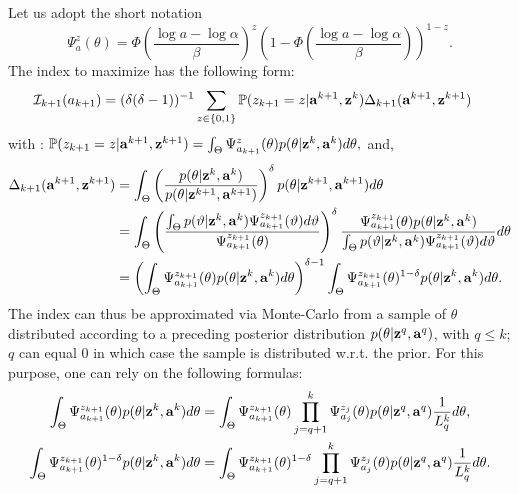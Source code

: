Let us adopt the short notation
    \begin{equation}
        \Psi^z_a(\theta)=\Phi\left(\frac{\log a-\log\alpha}{\beta}\right)^z\left(1-\Phi\left(\frac{\log a-\log\alpha}{\beta}\right)\right)^{1-z}.
    \end{equation}
The index to maximize has the following form:
    \begin{align}
        \mathcal{I}_{k+1}(a_{k+1})&= (\delta(\delta-1))^{-1}
            \sum_{z\in\{0,1\}}
                \mathbb{P}({z_{k+1}}=z|\mathbf{a}^{k+1},\mathbf{z}^{k})
                \Delta_{k+1}(\mathbf{a}^{k+1},\mathbf{z}^{k+1})
    \end{align}
with :
        $\mathbb{P}({z_{k+1}}=z|\mathbf{a}^{k+1},\mathbf{z}^{k+1}) = \int_{\Theta}\Psi^{z}_{a_{k+1}}(\theta)p(\theta|\mathbf{z}^{k},\mathbf{a}^{k})d\theta,$
and,
    \begin{align}
        \Delta_{k+1}(\mathbf{a}^{k+1},\mathbf{z}^{k+1}) &=
            \int_{\Theta}\left(\frac{p(\theta|\mathbf{z}^{k},\mathbf{a}^{k})}{p(\theta|\mathbf{z}^{k+1},\mathbf{a}^{k+1})}\right)^{\delta}p(\theta|\mathbf{z}^{k+1},\mathbf{a}^{k+1})d\theta \nonumber\\
        &=\int_\Theta \left(\frac{\int_\Theta p(\vartheta|\mathbf{z}^k,\mathbf{a}^k)\Psi^{z_{k+1}}_{a_{k+1}}(\vartheta)d\vartheta}{\Psi^{z_{k+1}}_{a_{k+1}}(\theta) } \right)^\delta \frac{\Psi^{z_{k+1}}_{a_{k+1}}(\theta)p(\theta|\mathbf{z}^k,\mathbf{a}^k) }{\int_\Theta p(\vartheta|\mathbf{z}^k,\mathbf{a}^k)\Psi^{z_{k+1}}_{a_{k+1}}(\vartheta)d\vartheta} d\theta\\
        &= \left(\int_\Theta \Psi^{z_{k+1}}_{a_{k+1}}(\theta) p(\theta| \mathbf{z}^k, \mathbf{a}^k) d\theta\right)^{\delta-1}  \int_\Theta \Psi^{z_{k+1}}_{a_{k+1}}(\theta)^{1-\delta} p(\theta|\mathbf{z}^k,\mathbf{a}^k)  d\theta.\nonumber
    \end{align}
The index can thus be approximated via Monte-Carlo from a sample of $\theta$ distributed according to a preceding posterior distribution $p(\theta|\mathbf{z}^q,\mathbf{a}^q)$, with $q\leq k$; $q$ can equal $0$ in which case the sample is distributed w.r.t. the prior. For this purpose, one can rely on the following formulas:
    \begin{align}
        \int_\Theta\Psi^{z_{k+1}}_{a_{k+1}}(\theta)p(\theta|\mathbf{z}^k,\mathbf{a}^k)d\theta &= \int_\Theta \Psi^{z_{k+1}}_{a_{k+1}}(\theta)\prod_{j=q+1}^k\Psi^{z_{j}}_{a_{j}}(\theta)p(\theta|\mathbf{z}^q,\mathbf{a}^q)\frac{1}{L_q^k}d\theta ,\\
        \int_\Theta\Psi^{z_{k+1}}_{a_{k+1}}(\theta)^{1-\delta}p(\theta|\mathbf{z}^k,\mathbf{a}^k)d\theta &= \int_\Theta \Psi^{z_{k+1}}_{a_{k+1}}(\theta)^{1-\delta}\prod_{j=q+1}^k\Psi^{z_{j}}_{a_{j}}(\theta)p(\theta|\mathbf{z}^q,\mathbf{a}^q)\frac{1}{L^k_q}d\theta.\nonumber
    \end{align}

